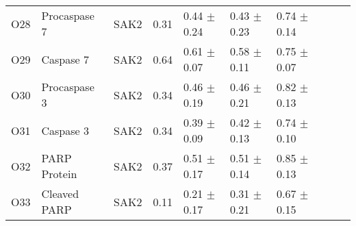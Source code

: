 \begin{center}
\begin{scriptsize}
\begin{supertabular}{l l l l l l l l l l}
O28 & Procaspase 7 & SAK2 &  0.31 & 0.44 $\pm$ 0.24 & 0.43 $\pm$ 0.23 & 0.74 $\pm$ 0.14 & \cite{rao2002cer} \\
O29 & Caspase 7 & SAK2 & 0.64 & 0.61 $\pm$ 0.07 & 0.58 $\pm$ 0.11 & 0.75 $\pm$ 0.07 & \cite{rao2002cer} \\
O30 & Procaspase 3 & SAK2 & 0.34 & 0.46 $\pm$ 0.19 & 0.46 $\pm$ 0.21 & 0.82 $\pm$ 0.13 & \cite{rao2002cer} \\
O31 & Caspase 3 & SAK2 & 0.34 & 0.39 $\pm$ 0.09 & 0.42 $\pm$ 0.13 & 0.74 $\pm$ 0.10 & \cite{rao2002cer} \\
O32 & PARP Protein & SAK2 & 0.37 & 0.51 $\pm$ 0.17 & 0.51 $\pm$ 0.14 & 0.85 $\pm$ 0.13 & \cite{rao2002cer} \\
O33 & Cleaved PARP & SAK2 & 0.11 & 0.21 $\pm$ 0.17 & 0.31 $\pm$ 0.21 & 0.67 $\pm$ 0.15 & \cite{rao2002cer} \\


\end{supertabular}
\end{scriptsize}
\end{center}

\clearpage

